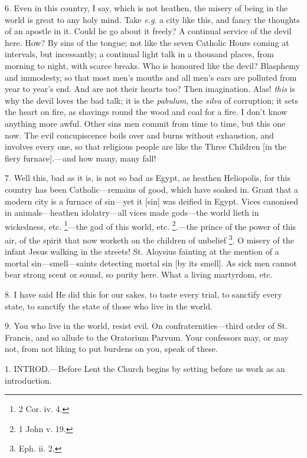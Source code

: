 6. Even in this country, I say, which is not
heathen, the misery of being in the world is great to any holy
mind. Take \emph{e.g}. a city like this, and fancy the thoughts of an
apostle in it. Could he go about it freely? A continual service of the
devil here. How? By sins of the tongue; not like the seven Catholic
Hours coming at intervals, but incessantly; a continual light talk in
a thousand places, from morning to night, with scarce breaks. Who is
honoured like the devil? Blasphemy and immodesty, so that most men's
mouths and all men's ears are polluted from year to year's end. And
are not their hearts too? Then imagination. Alas! \emph{this} is why
the devil loves the bad talk; it is the \emph{pabulum}, the \emph{silva}
of corruption; it sets the heart on fire, as shavings round the wood
and coal for a fire. I don't know anything more awful. Other sins men
commit from time to time, but this one now. The evil concupiscence
boils over and burns without exhaustion, and involves every one, so
that religious people are like the Three Children [in the fiery
furnace].—and how many, many fall!

7. Well this, bad as it is, is not so bad as
Egypt, as heathen Heliopolis, for this country has been
Catholic—remains of good, which have soaked in. Grant that a modern
city is a furnace of sin—yet it [sin] was deified in Egypt. Vices
canonised in animals—heathen idolatry—all vices made gods—the
world lieth in wickedness, etc. \footnote{2 Cor. iv. 4.}—the god of this world, etc. \footnote{1 John v. 19.}.—the prince of the power of this air, of the spirit that now
worketh on the children of unbelief \footnote{Eph. ii. 2.}. O misery of the infant Jesus walking in the streets! St.
Aloysius fainting at the mention of a mortal sin—smell—saints
detecting mortal sin [by its smell]. As sick men cannot bear
strong scent or sound, so purity here. What a living martyrdom, etc.

8. I have said He did this for our sakes, to
taste every trial, to sanctify every state, to sanctify the state of
those who live in the world.

9. You who live in the world, resist evil. On
confraternities—third order of St. Francis, and so allude to the
Oratorium Parvum. Your confessors may, or may not, from not liking to
put burdens on you, speak of these.


1. INTROD.—Before
Lent the Church begins by setting before us work as an introduction.

